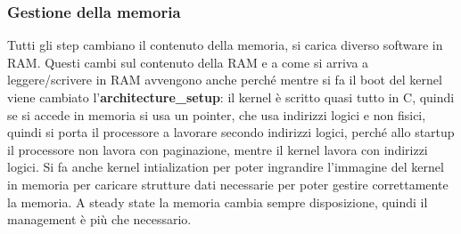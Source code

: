 \documentclass[12pt, oneside]{extbook}
\begin{document}
\subsubsection{Gestione della memoria}
Tutti gli step cambiano il contenuto della memoria, si carica diverso software in RAM. Questi cambi sul contenuto della RAM e a come si arriva a leggere/scrivere in RAM avvengono anche perché mentre si fa il boot del kernel viene cambiato l'\textbf{architecture\_setup}: il kernel è scritto quasi tutto in C, quindi se si accede in memoria si usa un pointer, che usa indirizzi logici e non fisici, quindi si porta il processore a lavorare secondo indirizzi logici, perché allo startup il processore non lavora con paginazione, mentre il kernel lavora con indirizzi logici. Si fa anche kernel intialization per poter ingrandire l'immagine del kernel in memoria per caricare strutture dati necessarie per poter gestire correttamente la memoria. A steady state la memoria cambia sempre disposizione, quindi il management è più che necessario.
\end{document}
